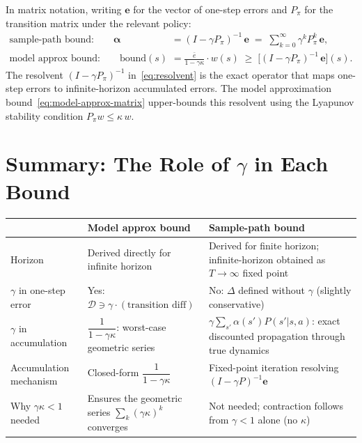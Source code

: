 \documentclass[11pt]{article}
\begin{document}
\noindent
In matrix notation, writing $\mathbf{e}$ for the vector of one-step errors and
$P_\pi$ for the transition matrix under the relevant policy:
\begin{align}
  \text{sample-path bound:} \qquad
  \boldsymbol{\alpha} &= (I - \gamma P_\pi)^{-1}\, \mathbf{e}
  \;=\; \sum_{k=0}^{\infty} \gamma^k P_\pi^k\, \mathbf{e}, \label{eq:resolvent} \\[4pt]
  \text{model approx bound:} \qquad
  \text{bound}(s) &= \frac{\bar{e}}{1-\gamma\kappa} \cdot w(s)
  \;\ge\; \bigl[(I - \gamma P_\pi)^{-1}\, \mathbf{e}\bigr](s). \label{eq:model-approx-matrix}
\end{align}
The resolvent $(I - \gamma P_\pi)^{-1}$ in~\eqref{eq:resolvent} is the exact
operator that maps one-step errors to infinite-horizon accumulated errors.  The
model approximation bound~\eqref{eq:model-approx-matrix} upper-bounds this
resolvent using the Lyapunov stability condition $P_\pi w \le \kappa\, w$.

\section{Summary: The Role of $\gamma$ in Each Bound}

\begin{center}
\renewcommand{\arraystretch}{1.4}
\begin{tabular}{p{3.5cm}p{5.5cm}p{5.5cm}}
\toprule
& \textbf{Model approx bound} & \textbf{Sample-path bound} \\
\midrule
Horizon
  & Derived directly for infinite horizon
  & Derived for finite horizon; infinite-horizon obtained as $T \to \infty$ fixed point \\
$\gamma$ in one-step error
  & Yes: $\mathcal{D} \ni \gamma \cdot (\text{transition diff})$
  & No: $\Delta$ defined without $\gamma$ (slightly conservative) \\
$\gamma$ in accumulation
  & $\dfrac{1}{1-\gamma\kappa}$: worst-case geometric series
  & $\gamma \sum_{s'} \alpha(s') P(s'|s,a)$: exact discounted propagation through true dynamics \\
Accumulation mechanism
  & Closed-form $\dfrac{1}{1-\gamma\kappa}$
  & Fixed-point iteration resolving $(I - \gamma P)^{-1} \mathbf{e}$ \\
Why $\gamma\kappa < 1$ needed
  & Ensures the geometric series $\sum_k (\gamma\kappa)^k$ converges
  & Not needed; contraction follows from $\gamma < 1$ alone (no $\kappa$) \\
\bottomrule
\end{tabular}
\end{center}
\end{document}
